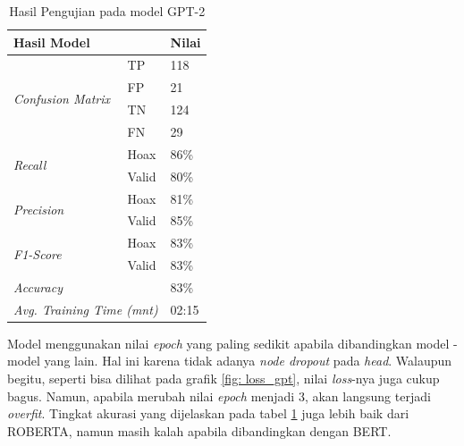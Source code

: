 \begin{table}[h]
    \caption{Hasil Pengujian pada model GPT-2}
    \label{tab: loss_gpt}
    \centering
    \begin{tabular}{|l|l|l|}
        \hline
        \multicolumn{2}{|l|}{\textbf{Hasil Model}}              & \textbf{Nilai}        \\ \hline
        \multirow{4}{*}{\textit{Confusion Matrix}}              & TP             & 118  \\ \cline{2-3}
                                                                & FP             & 21   \\ \cline{2-3}
                                                                & TN             & 124  \\ \cline{2-3}
                                                                & FN             & 29   \\ \hline
        \multirow{2}{*}{\textit{Recall}}                        & Hoax           & 86\% \\ \cline{2-3}
                                                                & Valid          & 80\% \\ \hline
        \multirow{2}{*}{\textit{Precision}}                     & Hoax           & 81\% \\ \cline{2-3}
                                                                & Valid          & 85\% \\ \hline
        \multirow{2}{*}{\textit{F1-Score}}                      & Hoax           & 83\% \\ \cline{2-3}
                                                                & Valid          & 83\% \\ \hline
        \multicolumn{2}{|l|}{\textit{Accuracy}}                 & 83\%                  \\ \hline
        \multicolumn{2}{|l|}{\textit{Avg. Training Time (mnt)}} & 02:15                 \\ \hline
    \end{tabular}
\end{table}

Model menggunakan nilai \textit{epoch} yang paling sedikit apabila dibandingkan model - model yang lain. Hal ini karena tidak adanya \textit{node dropout} pada \textit{head}. Walaupun begitu, seperti bisa dilihat pada grafik \ref{fig: loss_gpt}, nilai \textit{loss}-nya juga cukup bagus. Namun, apabila merubah nilai \textit{epoch} menjadi 3, akan langsung terjadi \textit{overfit}. Tingkat akurasi yang dijelaskan pada tabel \ref{tab: loss_gpt} juga lebih baik dari ROBERTA, namun masih kalah apabila dibandingkan dengan BERT.

